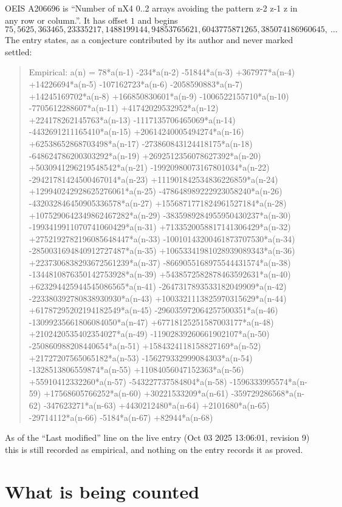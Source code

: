 \documentclass[11pt,a4paper]{article}
\theoremstyle{plain}
\theoremstyle{definition}
\begin{document}
OEIS A206696 is ``Number of nX4 0..2 arrays avoiding the pattern z-2 z-1 z in any row or column.''. It has offset $1$ and begins
\[
75, 5625, 363465, 23335217, 1488199144, 94853765621, 6043775871265, 385074186960645,\ \dots
\]
The entry states, as a conjecture contributed by its author and never marked settled:
\begin{quote}
Empirical: a(n) = 78*a(n-1) -234*a(n-2) -51844*a(n-3) +367977*a(n-4) +14226694*a(n-5) -107162723*a(n-6) -2058590883*a(n-7) +14245169702*a(n-8) +166850830601*a(n-9) -1006522155710*a(n-10) -7705612288607*a(n-11) +41742029532952*a(n-12) +224178262145763*a(n-13) -1117135706465069*a(n-14) -4432691211165410*a(n-15) +20614240005494274*a(n-16) +62538652868703498*a(n-17) -273860843124418175*a(n-18) -648624786200303292*a(n-19) +2692512356078627392*a(n-20) +5030941296219548542*a(n-21) -19920980073167801034*a(n-22) -29421781424500467014*a(n-23) +111901842534836226859*a(n-24) +129940242928625276061*a(n-25) -478648989222923058240*a(n-26) -432032846450905336578*a(n-27) +1556871771824961527184*a(n-28) +1075290642349862467282*a(n-29) -3835989284955950430237*a(n-30) -1993419911070741060429*a(n-31) +7133520058817141306429*a(n-32) +2752192782196085648447*a(n-33) -10010143200461873707530*a(n-34) -2850031694840912727487*a(n-35) +10653341981028939089343*a(n-36) +2237306838293672561239*a(n-37) -8669055168975544431574*a(n-38) -1344810876350142753928*a(n-39) +5438572582878463592631*a(n-40) +623294425944545086565*a(n-41) -2647317893533182049909*a(n-42) -223380392780838930930*a(n-43) +1003321113825970315629*a(n-44) +61787295202194182549*a(n-45) -296035972064257500351*a(n-46) -13099235661806084050*a(n-47) +67718125251587003177*a(n-48) +2102420535402354027*a(n-49) -11902839260661902107*a(n-50) -250860988208440654*a(n-51) +1584324118158827169*a(n-52) +21727207565065182*a(n-53) -156279332999084303*a(n-54) -1328513806559874*a(n-55) +11084056047152363*a(n-56) +55910412332260*a(n-57) -543227737584804*a(n-58) -1596333995574*a(n-59) +17568605766252*a(n-60) +30221533209*a(n-61) -359729286568*a(n-62) -347623271*a(n-63) +4430212480*a(n-64) +2101680*a(n-65) -29714112*a(n-66) -5184*a(n-67) +82944*a(n-68)
\end{quote}
As of the ``Last modified'' line on the live entry (Oct 03 2025 13:06:01, revision 9) this is still
recorded as empirical, and nothing on the entry records it as proved.

\section{What is being counted}
\end{document}
